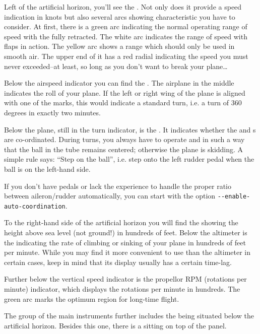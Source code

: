 Left of the artificial horizon, you'll see the . Not
only does
it provide a speed indication in knots but also several arcs showing
characteristic
 you have to consider. At first, there is a green arc
indicating
the normal operating range of speed with the  fully retracted. The
white arc
indicates the range of speed with flaps in action. The yellow arc shows a range
which
should only be used in smooth air. The upper end of it has a red radial
indicating the
speed you must never exceeded--at least, so long as you don't want to break your plane\ldots

Below the airspeed indicator you can find the . The
airplane in the
middle indicates the roll of your plane. If the left or right wing of the plane
is
aligned with one of the marks, this would indicate a standard turn, i.e. a turn
of 360
degrees in exactly two minutes.

Below the plane, still in the turn indicator, is the . It
indicates
whether the  and s are co-ordinated. During turns, you always
have to
operate  and  in such a way that the ball in the
tube
remains centered; otherwise the plane is skidding. A simple rule says:
``Step on the ball'', i.e. step onto the left rudder pedal when
the ball is on the left-hand side.
\medskip

If you don't have pedals or lack the experience to handle the proper
ratio between aileron/rudder automatically, you can start \FlightGear{}
with the option \texttt{-$ $-enable-auto-coordination}.

To the right-hand side of the artificial horizon you will find the 
showing the height
above sea level (not ground!) in hundreds of feet.  Below the altimeter is the
 indicating the rate of climbing or sinking of
your plane
in hundreds of feet per minute. While you may find it more convenient to use
than the
altimeter in certain cases, keep in mind that its display usually has a certain time-lag.

Further below the vertical speed indicator is the propellor RPM (rotations per minute)
indicator, which displays the rotations per minute  in hundreds. The
green arc marks the optimum region for long-time flight.

The group of the main instruments further includes the 
being
situated below the artificial horizon. Besides this one, there is a
 sitting on top of the panel.

